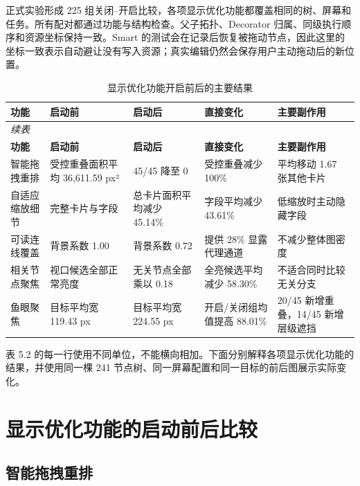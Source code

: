 \documentclass[11pt,a4paper,oneside,extrafontsizes]{memoir}
\begin{document}
正式实验形成 225 组关闭–开启比较，各项显示优化功能都覆盖相同的树、屏幕和任务。所有配对都通过功能与结构检查。父子拓扑、Decorator 归属、同级执行顺序和资源坐标保持一致。Smart 的测试会在记录后恢复被拖动节点，因此这里的坐标一致表示自动避让没有写入资源；真实编辑仍然会保存用户主动拖动后的新位置。

\begin{center}
\small
\begin{longtable}{@{}p{} p{} p{} p{} p{}@{}}
\caption{显示优化功能开启前后的主要结果}\label{tab:auto-7}\\
\toprule
\textbf{功能} & \textbf{启动前} & \textbf{启动后} & \textbf{直接变化} & \textbf{主要副作用} \\
\midrule
\endfirsthead
\multicolumn{5}{l}{\small\itshape 续表}\\
\toprule
\textbf{功能} & \textbf{启动前} & \textbf{启动后} & \textbf{直接变化} & \textbf{主要副作用} \\
\midrule
\endhead
智能拖拽重排 & 受控重叠面积平均 36,611.59 px² & 45/45 降至 0 & 受控重叠减少 100\% & 平均移动 1.67 张其他卡片 \\
自适应缩放细节 & 完整卡片与字段 & 总卡片面积平均减少 45.14\% & 字段平均减少 43.61\% & 低缩放时主动隐藏字段 \\
可读连线覆盖 & 背景系数 1.00 & 背景系数 0.72 & 提供 28\% 显露代理通道 & 不减少整体图密度 \\
相关节点聚焦 & 视口候选全部正常亮度 & 无关节点全部乘以 0.18 & 全亮候选平均减少 58.30\% & 不适合同时比较无关分支 \\
鱼眼聚焦 & 目标平均宽 119.43 px & 目标平均宽 224.55 px & 开启/关闭组均值提高 88.01\% & 20/45 新增重叠，14/45 新增层级遮挡 \\
\bottomrule
\end{longtable}
\end{center}

表 5.2 的每一行使用不同单位，不能横向相加。下面分别解释各项显示优化功能的结果，并使用同一棵 241 节点树、同一屏幕配置和同一目标的前后图展示实际变化。

\section{显示优化功能的启动前后比较}

\subsection{智能拖拽重排}
\end{document}
